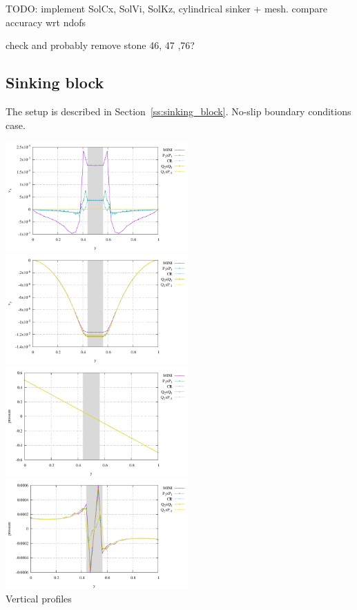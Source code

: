 TODO: implement SolCx, SolVi, SolKz, cylindrical sinker + mesh.
compare accuracy wrt ndofs

check and probably remove stone 46, 47 ,76?

\subsection*{Sinking block}

The setup is described in Section~\ref{ss:sinking_block}. No-slip boundary conditions case.

\begin{center}
\includegraphics[width=7cm]{python_codes/fieldstone_112/results/exp2/vprofile_u.pdf}
\includegraphics[width=7cm]{python_codes/fieldstone_112/results/exp2/vprofile_v.pdf}\\
\includegraphics[width=7cm]{python_codes/fieldstone_112/results/exp2/vprofile_p.pdf}
\includegraphics[width=7cm]{python_codes/fieldstone_112/results/exp2/vprofile_pdyn.pdf}\\
{\captionfont Vertical profiles}
\end{center}

